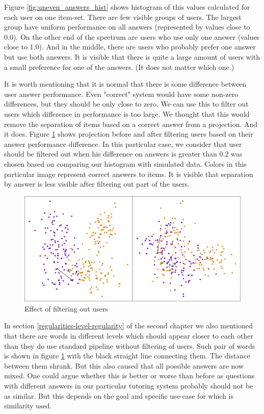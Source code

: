 \documentclass[
  digital, %
  table,   %
  nolof,     %
  nolot,     %
  nocover,
  color,
  final, %
]{fithesis3}
\begin{document}
Figure \ref{fig:uneven_answers_hist} shows histogram of this values calculated for each user on one item-set. There are few visible groups of users. The largest group have uniform performance on all answers (represented by values close to 0.0). On the other end of the spectrum are users who use only one answer (values close to 1.0). And in the middle, there are users who probably prefer one answer but use both answers. It is visible that there is quite a large amount of users with a small preference for one of the answers. (It does not matter which one.)


It is worth mentioning that it is normal that there is some difference between user answer performance. Even "correct" system would have some non-zero differences, but they should be only close to zero. We can use this to filter out users which difference in performance is too large. We thought that this would remove the separation of items based on a correct answer from a projection. And it does. Figure \ref{fig:answers_normalization} shows projection before and after filtering users based on their answer performance difference. In this particular case, we consider that user should be filtered out when his difference on answers is greater than 0.2 was chosen based on comparing our histogram with simulated data. Colors in this particular image represent correct answers to items. It is visible that separation by answer is less visible after filtering out part of the users.

\begin{figure}
  \includegraphics[width=\textwidth]{img/answers_normalization}
  \caption{Effect of filtering out users}
  \label{fig:answers_normalization}
\end{figure}

In section \ref{regularities-level-regularity} of the second chapter we also mentioned that there are words in different levels which should appear closer to each other than they do use standard pipeline without filtering of users. Such pair of words is shown in figure \ref{fig:answers_normalization} with the black straight line connecting them. The distance between them shrank. But this also caused that all possible answers are now mixed. One could argue whether this is better or worse than before as questions with different answers in our particular tutoring system probably should not be as similar. But this depends on the goal and specific use-case for which is similarity used.
\end{document}
